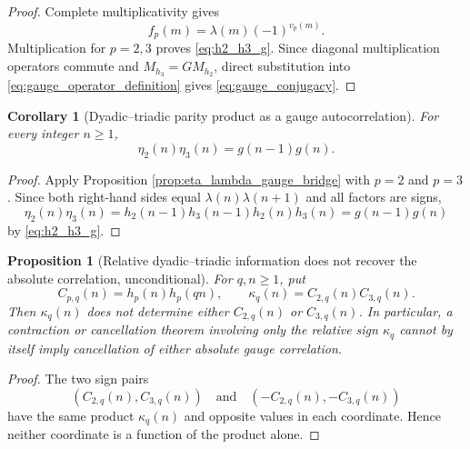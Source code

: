 \documentclass[11pt]{amsart}
\numberwithin{equation}{section}
\theoremstyle{plain}
\newtheorem{proposition}[theorem]{Proposition}
\newtheorem{corollary}[theorem]{Corollary}
\theoremstyle{definition}
\theoremstyle{remark}
\newcommand{\liou}{\lambda}
\begin{document}
\begin{proof}
Complete multiplicativity gives
\begin{equation}
f_p(m)=\liou(m)(-1)^{v_p(m)}.
\label{eq:fp_complete_multiplicativity}
\end{equation}
Multiplication for $p=2,3$ proves \eqref{eq:h2_h3_g}.  Since diagonal multiplication operators commute and $M_{h_3}=GM_{h_2}$, direct substitution into \eqref{eq:gauge_operator_definition} gives \eqref{eq:gauge_conjugacy}.
\end{proof}

\begin{corollary}[Dyadic--triadic parity product as a gauge autocorrelation]
\label{cor:eta2_eta3_g}
For every integer $n\ge1$,
\begin{equation}
\eta_2(n)\eta_3(n)=g(n-1)g(n).
\label{eq:eta2_eta3_g}
\end{equation}
\end{corollary}

\begin{proof}
Apply Proposition \ref{prop:eta_lambda_gauge_bridge} with $p=2$ and $p=3$.  Since both right-hand sides equal $\liou(n)\liou(n+1)$ and all factors are signs,
\begin{equation}
\eta_2(n)\eta_3(n)
=h_2(n-1)h_3(n-1)h_2(n)h_3(n)
=g(n-1)g(n)
\end{equation}
by \eqref{eq:h2_h3_g}.
\end{proof}

\begin{proposition}[Relative dyadic--triadic information does not recover the absolute correlation, unconditional]
\label{prop:relative_not_absolute}
For $q,n\ge1$, put
\begin{equation}
C_{p,q}(n)=h_p(n)h_p(qn),
\qquad
\kappa_q(n)=C_{2,q}(n)C_{3,q}(n).
\label{eq:gauge_correlations}
\end{equation}
Then $\kappa_q(n)$ does not determine either $C_{2,q}(n)$ or $C_{3,q}(n)$.  In particular, a contraction or cancellation theorem involving only the relative sign $\kappa_q$ cannot by itself imply cancellation of either absolute gauge correlation.
\end{proposition}

\begin{proof}
The two sign pairs
\begin{equation}
(C_{2,q}(n),C_{3,q}(n))
\quad\text{and}\quad
(-C_{2,q}(n),-C_{3,q}(n))
\label{eq:relative_sign_ambiguity}
\end{equation}
have the same product $\kappa_q(n)$ and opposite values in each coordinate.  Hence neither coordinate is a function of the product alone.
\end{proof}
\end{document}
